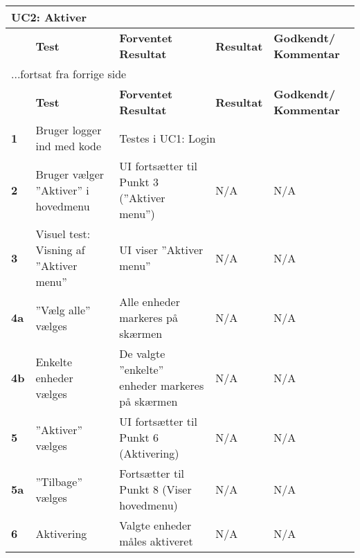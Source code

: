 
\begin{center}
\begin{longtable}{|p{}|p{}|p{}|p{}|p{}|} %
\hline
\multicolumn{5}{|l|}{\textbf{UC2: Aktiver}} \\ \hline
\multicolumn{1}{|c|}{} &
\textbf{Test} &
\textbf{Forventet \newline Resultat} &
\textbf{Resultat} &
\textbf{Godkendt/ \newline Kommentar} \\ \hline 
\endfirsthead

\multicolumn{5}{l}{...fortsat fra forrige side} \\ \hline 
\multicolumn{1}{|c|}{} &
\textbf{Test} &
\textbf{Forventet \newline Resultat} &
\textbf{Resultat} &
\textbf{Godkendt/ \newline Kommentar} \\ \hline 
\endhead


\textbf{1}			&Bruger logger ind med kode	
					&\multicolumn{3}{l|}{Testes i UC1: Login} \\\hline
		
\textbf{2}			&Bruger vælger ''Aktiver'' i hovedmenu																
					&UI fortsætter til Punkt 3 (''Aktiver menu'')
					&N/A 
					&N/A \\\hline
					
\textbf{3}			&Visuel test: Visning af ''Aktiver menu''																
					&UI viser ''Aktiver menu''
					&N/A 
					&N/A \\\hline
		
\textbf{4a}			&''Vælg alle'' vælges		
					&Alle enheder markeres på skærmen		 	
					&N/A 
					&N/A \\\hline

\textbf{4b}			&Enkelte enheder vælges
					&De valgte ''enkelte'' enheder markeres på skærmen
					&N/A 
					&N/A \\\hline

\textbf{5}			&''Aktiver'' vælges			
					&UI fortsætter til Punkt 6 (Aktivering)
					&N/A 
					&N/A \\\hline
					
\textbf{5a}			&''Tilbage'' vælges			
					&Fortsætter til Punkt 8 (Viser hovedmenu)
					&N/A 
					&N/A \\\hline

\textbf{6}			&Aktivering			
					&Valgte enheder måles aktiveret
					&N/A 
					&N/A \\\hline
															

\end{longtable}
\end{center}

